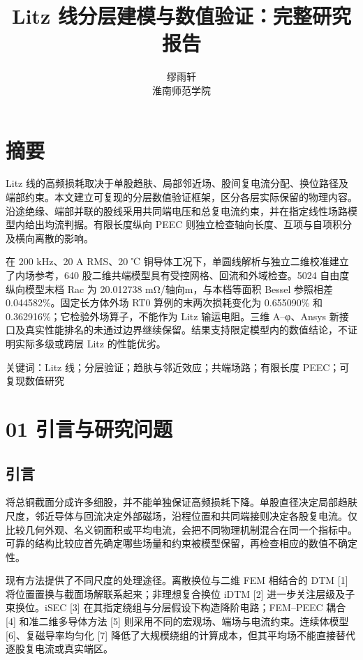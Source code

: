 \documentclass[11pt]{article}
\begin{document}
\title{Litz 线分层建模与数值验证：完整研究报告}
\author{缪雨轩\\淮南师范学院}
\date{}
\maketitle
\FloatBarrier
\section*{摘要}
\hypertarget{abstract}{}
Litz 线的高频损耗取决于单股趋肤、局部邻近场、股间复电流分配、换位路径及端部约束。本文建立可复现的分层数值验证框架，区分各层实际保留的物理内容。沿途绝缘、端部并联的股线采用共同端电压和总复电流约束，并在指定线性场路模型内给出均流判据。有限长度纵向 PEEC 则独立检查轴向长度、互项与自项积分及横向离散的影响。

在 200 kHz、20 A RMS、20 ℃ 铜导体工况下，单圆线解析与独立二维校准建立了内场参考，640 股二维共端模型具有受控网格、回流和外域检查。5024 自由度纵向模型末档 Rac 为 20.012738 mΩ/轴向m，与本档等面积 Bessel 参照相差 0.044582\%。固定长方体外场 RT0 算例的末两次损耗变化为 0.655090\% 和 0.362916\%；它检验外场算子，不能作为 Litz 输运电阻。三维 A–φ、Ansys 新接口及真实性能排名的未通过边界继续保留。结果支持限定模型内的数值结论，不证明实际多级或跨层 Litz 的性能优劣。


关键词：Litz 线；分层验证；趋肤与邻近效应；共端场路；有限长度 PEEC；可复现数值研究


\FloatBarrier
\section*{01 引言与研究问题}
\hypertarget{chapter-01}{}
\subsection*{引言}
\hypertarget{01.introduction.heading}{}
将总铜截面分成许多细股，并不能单独保证高频损耗下降。单股直径决定局部趋肤尺度，邻近导体与回流决定外部磁场，沿程位置和共同端接则决定各股复电流。仅比较几何外观、名义铜面积或平均电流，会把不同物理机制混合在同一个指标中。可靠的结构比较应首先确定哪些场量和约束被模型保留，再检查相应的数值不确定性。


现有方法提供了不同尺度的处理途径。离散换位与二维 FEM 相结合的 DTM [1] 将位置置换与截面场解联系起来；非理想复合换位 iDTM [2] 进一步关注层级及子束换位。iSEC [3] 在其指定绕组与分层假设下构造降阶电路；FEM–PEEC 耦合 [4] 和准二维多导体方法 [5] 则采用不同的宏观场、端场与电流约束。连续体模型 [6]、复磁导率均匀化 [7] 降低了大规模绕组的计算成本，但其平均场不能直接替代逐股复电流或真实端区。
\end{document}
